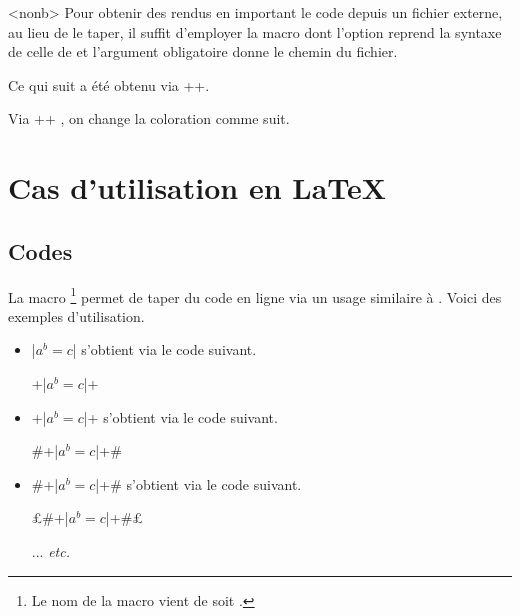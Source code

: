 \begin{bdocexa}<nonb>
    Pour obtenir des rendus en important le code depuis un fichier externe, au lieu de le taper, il suffit d'employer la macro  dont l'option reprend la syntaxe de celle de  et l'argument obligatoire donne le chemin du fichier.

    \medskip

    Ce qui suit a été obtenu via \bdocinlatex++.

    \medskip


    \medskip

    Via \bdocinlatex++ , on change la coloration comme suit.

    \medskip

\end{bdocexa}


\section{Cas d'utilisation en \LaTeX}

\subsection{Codes } \label{bdoc-listing-inline}

La macro 
\footnote{
	Le nom de la macro  vient de  soit .
}
permet de taper du code en ligne via un usage similaire à .
Voici des exemples d'utilisation.
\begin{itemize}
    \item \bdocinlatex|$a^b = c$| s'obtient via le code suivant.
		  \begin{center}
		  		\bdocinlatex+\bdocinlatex|$a^b = c$|+
		  \end{center}


    \item \bdocinlatex+\bdocinlatex|$a^b = c$|+ s'obtient via le code suivant.
		  \begin{center}
		  		\bdocinlatex#\bdocinlatex+\bdocinlatex|$a^b = c$|+#
		  \end{center}
          

    \item \bdocinlatex#\bdocinlatex+\bdocinlatex|$a^b = c$|+# s'obtient via le code suivant.
		  \begin{center}
		  		\bdocinlatex£\bdocinlatex#\bdocinlatex+\bdocinlatex|$a^b = c$|+#£
				
				\medskip
				
				... \emph{etc.}
		  \end{center}
\end{itemize}


